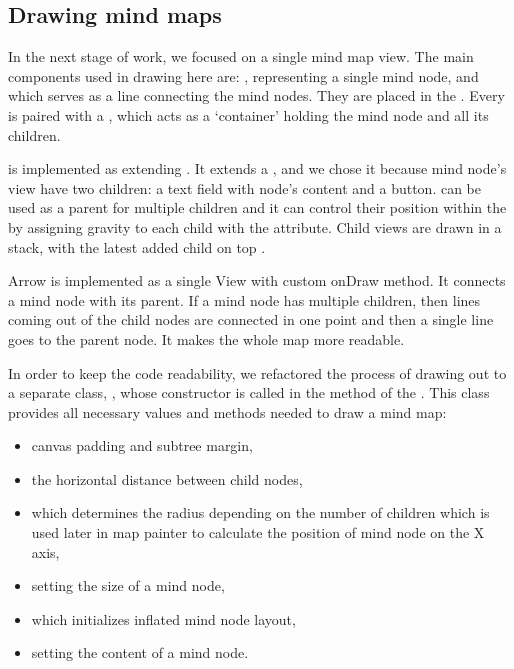 \subsection{Drawing mind maps}
\label{subsec:drawing}
In the next stage of work, we focused on a single mind map view. The main components used in drawing here are: , representing a single mind node, and  which serves as a line connecting the mind nodes. They are placed in the . Every  is paired with a , which acts as a `container' holding the mind node and all its children.

 is implemented as extending . It extends a , and we chose it because mind node's view have two children: a text field with node's content and a button.  can be used as a parent for multiple children and it can control their position within the  by assigning gravity to each child with the  attribute. Child views are drawn in a stack, with the latest added child on top \cite{API:2013:fl}.

Arrow is implemented as a single View with custom onDraw method. It connects a mind node with its parent. If a mind node has multiple children, then lines coming out of the child nodes are connected in one point and then a single line goes to the parent node. It makes the whole map more readable.

In order to keep the code readability, we refactored the process of drawing out to a separate class, , whose constructor is called in the  method of the . This class provides all necessary values and methods needed to draw a mind map:

\begin{itemize}
	\item canvas padding and subtree margin,
	\item the horizontal distance between child nodes,
	\item {} which determines the radius depending on the number of children which is used later in map painter to calculate the position of mind node on the X axis,
	\item {} setting the size of a mind node,
	\item {} which initializes inflated mind node layout,
	\item {} setting the content of a mind node.
\end{itemize}

